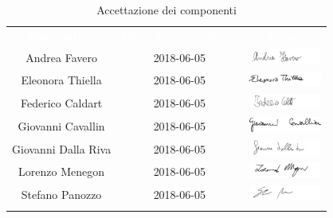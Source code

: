 \begin{longtable}{ c  c  c }
	\rowcolor{bluSOS}
	\textcolor{white}{\textbf{Nominativo}} & \textcolor{white}{\textbf{Data di accettazione}} & \textcolor{white}{\textbf{Firma}}\\
	Andrea Favero & 2018-06-05 & \includegraphics[height=0.5cm]{img/Firme/AndreaFavero.png} \\
	
	Eleonora Thiella & 2018-06-05 & \includegraphics[height=0.5cm]{img/Firme/EleonoraThiella.png} \\
	
	Federico Caldart & 2018-06-05 & \includegraphics[height=0.5cm]{img/Firme/FedericoCaldart.png} \\
	
	Giovanni Cavallin & 2018-06-05 & \includegraphics[height=0.5cm]{img/Firme/GiovanniCavallin.png} \\
	
	Giovanni Dalla Riva & 2018-06-05 & \includegraphics[height=0.5cm]{img/Firme/GiovanniDallaRiva.png} \\
	
	Lorenzo Menegon & 2018-06-05 & \includegraphics[height=0.5cm]{img/Firme/LorenzoMenegon.png} \\
	
	Stefano Panozzo & 2018-06-05 & \includegraphics[height=0.5cm]{img/Firme/StefanoPanozzo.png} \\
	\rowcolor{white}\caption{Accettazione dei componenti}\\
\end{longtable}


